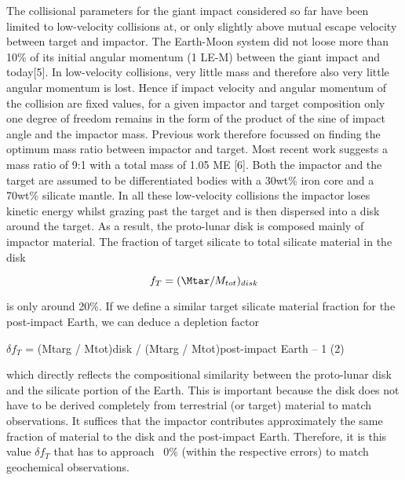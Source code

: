 The collisional parameters for the giant impact considered so far have been limited to low-velocity collisions at, or only slightly above mutual escape velocity between target and impactor. The Earth-Moon system did not loose more than 10\% of its initial angular momentum (1 LE-M) between the giant impact and today[5]. In low-velocity collisions, very little mass and therefore also very little angular momentum is lost. Hence if impact velocity and angular momentum of the collision are fixed values, for a given impactor and target composition only one degree of freedom remains in the form of the product of the sine of impact angle and the impactor mass. Previous work therefore focussed on finding the optimum mass ratio between impactor and target. Most recent work suggests a mass ratio of 9:1 with a total mass of 1.05 ME [6]. Both the impactor and the target are assumed to be differentiated bodies with a 30wt\% iron core and a 70wt\% silicate mantle. In all these low-velocity collisions the impactor loses kinetic energy whilst grazing past the target and is then dispersed into a disk around the target. As a result, the proto-lunar disk is composed mainly of impactor material. The fraction of target silicate to total silicate material in the disk

\begin{equation}
f_T = (\Mtar / M_{tot})_{disk}
\end{equation}


is only around 20\%. If we define a similar target silicate material fraction for the post-impact Earth, we can deduce a depletion factor
  
$\delta f_{T}$ = (Mtarg / Mtot)disk / (Mtarg / Mtot)post-impact Earth – 1 (2)

which directly reflects the compositional similarity between the proto-lunar disk and the silicate portion of the Earth. This is important because the disk does not have to be derived completely from terrestrial (or target) material to match observations. It suffices that  the impactor contributes approximately the same fraction of material to the disk and the post-impact Earth. Therefore, it is this value $\delta f_{T}$ that has to approach ~0\% (within the respective errors) to match geochemical observations.

